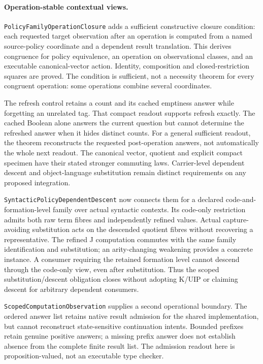 \documentclass[11pt]{article}
\theoremstyle{definition}
\theoremstyle{remark}
\begin{document}
\paragraph{Operation-stable contextual views.}
\texttt{PolicyFamilyOperationClosure} adds a sufficient constructive closure
condition: each requested target observation after an operation is computed
from a named source-policy coordinate and a dependent result translation.
This derives congruence for policy equivalence, an operation on observational
classes, and an executable canonical-vector action. Identity, composition and
closed-restriction squares are proved. The condition is sufficient, not a
necessity theorem for every congruent operation: some operations combine
several coordinates.

The refresh control retains a count and its cached emptiness answer while
forgetting an unrelated tag. That compact readout supports refresh exactly.
The cached Boolean alone answers the current question but cannot determine
the refreshed answer when it hides distinct counts. For a general sufficient
readout, the theorem reconstructs the requested post-operation answers, not
automatically the whole next readout. The canonical vector, quotient and
explicit compact specimen have their stated stronger commuting laws.
Carrier-level dependent descent and object-language substitution remain
distinct requirements on any proposed integration.

\texttt{SyntacticPolicyDependentDescent} now connects them for a declared
code-and-formation-level family over actual syntactic contexts. Its code-only
restriction admits both raw term fibres and independently refined values.
Actual capture-avoiding substitution acts on the descended quotient fibres
without recovering a representative. The refined J computation commutes with
the same family identification and substitution; an arity-changing weakening
provides a concrete instance. A consumer requiring the retained formation
level cannot descend through the code-only view, even after substitution.
Thus the scoped substitution/descent obligation closes without adopting
K/UIP or claiming descent for arbitrary dependent consumers.

\texttt{ScopedComputationObservation} supplies a second operational boundary.
The ordered answer list retains native result admission for the shared
implementation, but cannot reconstruct state-sensitive continuation intents.
Bounded prefixes retain genuine positive answers; a missing prefix answer
does not establish absence from the complete finite result list. The admission
readout here is proposition-valued, not an executable type checker.
\end{document}
